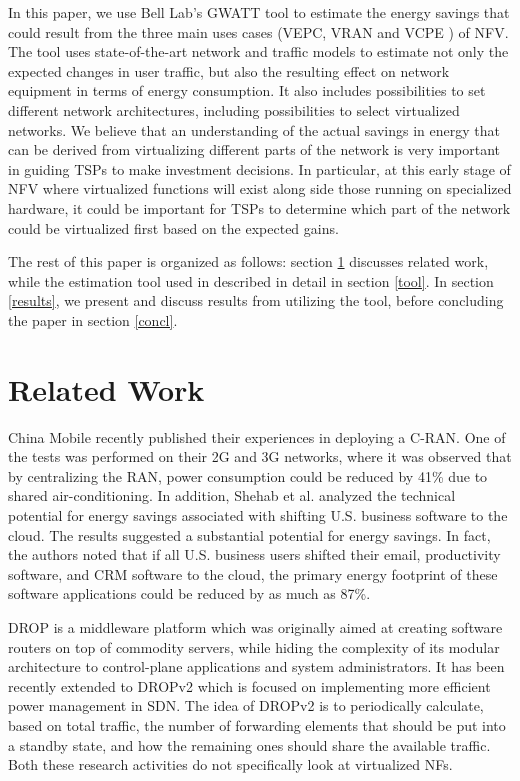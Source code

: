 \documentclass[conference]{IEEEtran}
\begin{document}
In this paper, we use Bell Lab's GWATT tool \cite{GWATT} to estimate the energy savings that could result from the three main uses cases (VEPC, VRAN and VCPE \cite{ETSIUseCases}) of NFV. The tool uses state-of-the-art network and traffic models to estimate not only the expected changes in user traffic, but also the resulting effect on network equipment in terms of energy consumption. It also includes possibilities to set different network architectures, including possibilities to select virtualized networks. We believe that an understanding of the actual savings in energy that can be derived from virtualizing different parts of the network is very important in guiding \acp{TSP} to make investment decisions. In particular, at this early stage of NFV where virtualized functions will exist along side those running on specialized hardware, it could be important for \acp{TSP} to determine which part of the network could be virtualized first based on the expected gains.

\indent The rest of this paper is organized as follows: section \ref{related} discusses related work, while the estimation tool used in described in detail in section \ref{tool}. In section \ref{results}, we present and discuss results from utilizing the tool, before concluding the paper in section \ref{concl}.

\section{Related Work}\label{related}

China Mobile recently published \cite{CRAN14} their experiences in deploying a \ac{C-RAN}. One of the tests was performed on their 2G and 3G networks, where it was observed that by centralizing the RAN, power consumption could be reduced by 41\% due to shared air-conditioning. In addition, Shehab et al. \cite{Shehab13} analyzed the technical potential for energy savings associated with shifting U.S. business software to the cloud. The results suggested a substantial potential for energy savings. In fact, the authors noted that if all U.S. business users shifted their email, productivity software, and CRM software to the cloud, the primary energy footprint of these software applications could be reduced by as much as 87\%.

DROP \cite{Bolla2013} is a middleware platform which was originally aimed at creating software routers on top of commodity servers, while hiding the complexity of its modular architecture to control-plane applications and system administrators. It has been recently extended to DROPv2 \cite{Bolla14} which is focused on implementing more efficient power management in SDN. The idea of DROPv2 is to periodically calculate, based on total traffic, the number of forwarding elements that should be put into a standby state, and how the remaining ones should share the available traffic. Both these research activities do not specifically look at virtualized \acp{NF}.
\end{document}
